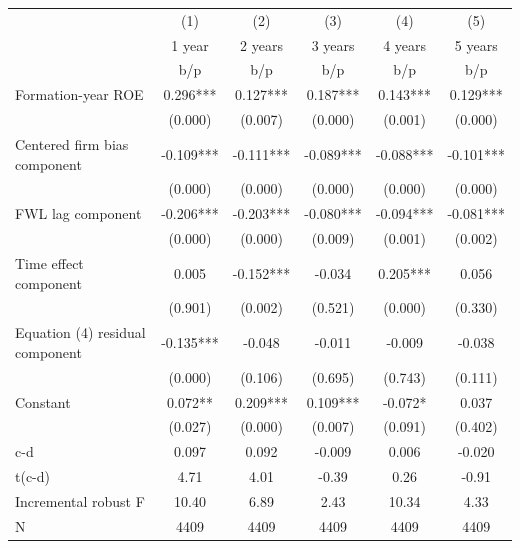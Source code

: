 {
\def\sym#1{\ifmmode^{#1}\else\(^{#1}\)\fi}
\begin{tabular}{l*{5}{c}}
\hline\hline
                    &\multicolumn{1}{c}{(1)}&\multicolumn{1}{c}{(2)}&\multicolumn{1}{c}{(3)}&\multicolumn{1}{c}{(4)}&\multicolumn{1}{c}{(5)}\\
                    &\multicolumn{1}{c}{1 year}&\multicolumn{1}{c}{2 years}&\multicolumn{1}{c}{3 years}&\multicolumn{1}{c}{4 years}&\multicolumn{1}{c}{5 years}\\
                    &         b/p   &         b/p   &         b/p   &         b/p   &         b/p   \\
\hline
Formation-year ROE  &       0.296***&       0.127***&       0.187***&       0.143***&       0.129***\\
                    &     (0.000)   &     (0.007)   &     (0.000)   &     (0.001)   &     (0.000)   \\
Centered firm bias component&      -0.109***&      -0.111***&      -0.089***&      -0.088***&      -0.101***\\
                    &     (0.000)   &     (0.000)   &     (0.000)   &     (0.000)   &     (0.000)   \\
FWL lag component   &      -0.206***&      -0.203***&      -0.080***&      -0.094***&      -0.081***\\
                    &     (0.000)   &     (0.000)   &     (0.009)   &     (0.001)   &     (0.002)   \\
Time effect component&       0.005   &      -0.152***&      -0.034   &       0.205***&       0.056   \\
                    &     (0.901)   &     (0.002)   &     (0.521)   &     (0.000)   &     (0.330)   \\
Equation (4) residual component&      -0.135***&      -0.048   &      -0.011   &      -0.009   &      -0.038   \\
                    &     (0.000)   &     (0.106)   &     (0.695)   &     (0.743)   &     (0.111)   \\
Constant            &       0.072** &       0.209***&       0.109***&      -0.072*  &       0.037   \\
                    &     (0.027)   &     (0.000)   &     (0.007)   &     (0.091)   &     (0.402)   \\
\hline
c-d                 &       0.097   &       0.092   &      -0.009   &       0.006   &      -0.020   \\
t(c-d)              &        4.71   &        4.01   &       -0.39   &        0.26   &       -0.91   \\
Incremental robust F&       10.40   &        6.89   &        2.43   &       10.34   &        4.33   \\
N                   &        4409   &        4409   &        4409   &        4409   &        4409   \\
\hline\hline
\end{tabular}
}
